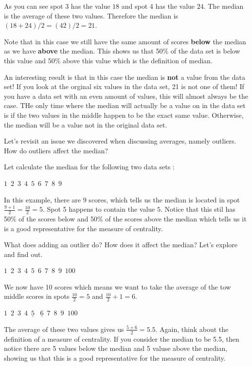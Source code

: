 \documentclass[
  letterpaper,
  DIV=11,
  numbers=noendperiod]{scrreprt}
\begin{document}
As you can see spot 3 has the value \(18\) and spot 4 has the value
\(24\). The median is the average of these two values. Therefore the
median is \((18 + 24)/2 = (42) / 2 = 21\).

Note that in this case we still have the same amount of scores
\textbf{below} the median as we have \textbf{above} the median. This
shows us that 50\% of the data set is below this value and 50\% above
this value which is the definition of median.

An interesting result is that in this case the median is \textbf{not} a
value from the data set! If you look at the orginal six values in the
data set, 21 is not one of them! If you have a data set with an even
amount of values, this will almost always be the case. THe only time
where the median will actually be a value on in the data set is if the
two values in the middle happen to be the exact same value. Otherwise,
the median will be a value not in the original data set.

Let's revisit an issue we discovered when discussing averages, namely
outliers. How do outliers affect the median?

Let calculate the median for the following two data sets :

\(1 \,\,\,2 \,\,\,3\,\,\,4\,\,\,5\,\,\,6\,\,\,7\,\,\,8\,\,\,9\)

In this example, there are \(9\) scores, which tells us the median is
located in spot \(\frac{9+1}{2} = \frac{10}{2}= 5\). Spot 5 happens to
contain the value \(5\). Notice that this stil has 50\% of the scores
below and 50\% of the scores above the median which tells us it is a
good representative for the measure of centrality.

What does adding an outlier do? How does it affect the median? Let's
explore and find out.

\(1 \,\,\,2 \,\,\,3\,\,\,4\,\,\,5\,\,\,6\,\,\,7\,\,\,8\,\,\,9\,\,\,100\)

We now have 10 scores which means we want to take the average of the tow
middle scores in spots \(\frac{10}{2} = 5\) and
\(\frac{10}{2} + 1 = 6\).

\(1 \,\,\,2 \,\,\,3\,\,\,4\,\,\underline{\,5\,}\,\,\,\underline{\,6\,}\,\,7\,\,\,8\,\,\,9\,\,\,100\)

The average of these two values gives us \(\frac{5 + 6}{2} = 5.5\).
Again, think about the definition of a measure of centrality. If you
consider the median to be 5.5, then notice there are 5 values below the
median and 5 valuse above the median, showing us that this is a good
representative for the measure of centrality.
\end{document}
